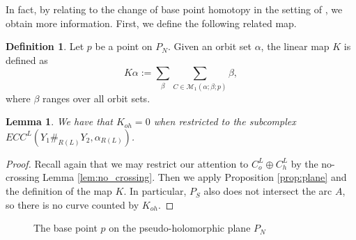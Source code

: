 \documentclass{article}
\numberwithin{equation}{section}
\newtheorem{lemma}[theorem]{Lemma}
\theoremstyle{definition}
\newtheorem{definition}[theorem]{Definition}
\begin{document}
In fact, by relating to the change of base point homotopy in the setting of \cite{HT_weinstein}, we obtain more information. First, we define the following related map.




\begin{definition}
Let $p$ be a point on $P_N$. Given an orbit set $\alpha$, the linear map $K$ is defined as
$$K \alpha:= \sum_{\beta} \sum_{C\in \mathcal{M}_{1}(\alpha; \beta; p)} \beta,$$
where $\beta$ ranges over all orbit sets.
\end{definition}

\begin{lemma}
\label{lem:K_oh}
We have that $K_{oh} = 0$ when restricted to the subcomplex $ECC^L(Y_1 \#_{R(L)} Y_2, \alpha_{R(L)})$.
\end{lemma}
\begin{proof}
Recall again that we may restrict our attention to $C_o^L \oplus C_h^L$ by the no-crossing Lemma \ref{lem:no_crossing}. Then we apply Proposition \ref{prop:plane} and the definition of the map $K$. In particular, $P_S$ also does not intersect the arc $A$, so there is no curve counted by $K_{oh}$.
\end{proof}


\begin{figure}
    \centering
    
    \caption{The base point $p$ on the pseudo-holomorphic plane $P_N$}
    \label{fig:basepointp}
\end{figure}
\end{document}
